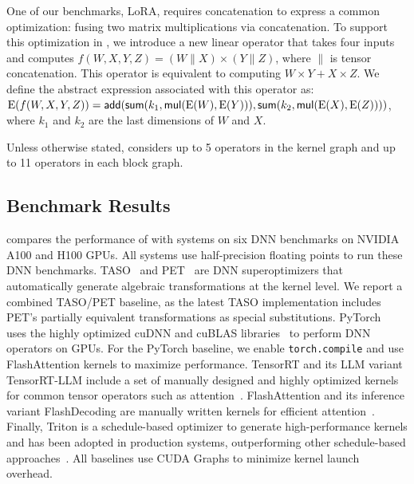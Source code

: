 One of our benchmarks, LoRA, requires  concatenation to express a common optimization: fusing two matrix multiplications via concatenation. To support this optimization in \sys, we introduce a new linear operator that takes four inputs and computes $f(W, X, Y, Z) = (W \| X) \times (Y \| Z)$, where $\|$ is tensor concatenation.
This operator is equivalent to computing $W \times Y + X \times Z$.
We define the abstract expression associated with this operator as: 
$\mathrm{E}(f(W, X, Y, Z)) = \mathsf{add}(\mathsf{sum}(k_1, \mathsf{mul}(\mathrm{E}(W), \mathrm{E}(Y))), \mathsf{sum}(k_2, \mathsf{mul}(\mathrm{E}(X), \mathrm{E}(Z))))$, where $k_1$ and $k_2$ are the last dimensions of $W$ and $X$.

Unless otherwise stated, \sys considers up to 5 operators in the kernel graph and up to 11 operators in each block graph.



\subsection{Benchmark Results}
\label{subsec:benchmark_results}
 compares the performance of \sys with systems on six DNN benchmarks on NVIDIA A100 and H100 GPUs.
All systems use half-precision floating points to run these DNN benchmarks.
%
TASO~\cite{TASO} and PET~\cite{wang2021pet} are DNN superoptimizers that automatically generate algebraic transformations at the kernel level.
We report a combined TASO/PET baseline, as the latest TASO implementation includes PET’s partially equivalent transformations as special substitutions.
%
PyTorch~\cite{pytorch} uses the highly optimized cuDNN and cuBLAS libraries~\cite{cublas,cudnn} to perform DNN operators on GPUs.
For the PyTorch baseline, we enable {\tt torch.compile} and use FlashAttention kernels to maximize performance.
%
TensorRT and its LLM variant TensorRT-LLM include a set of manually designed and highly optimized kernels for common tensor operators such as attention~\cite{tensorrt}.
%
FlashAttention and its inference variant FlashDecoding are manually written kernels for efficient attention~\cite{dao2023flash, hong2024flashdecoding}.
Finally, Triton is a schedule-based optimizer to generate high-performance kernels and has been adopted in production systems, outperforming other schedule-based approaches~\cite{tillet2019triton}.
All baselines use CUDA Graphs to minimize kernel launch overhead.
%

